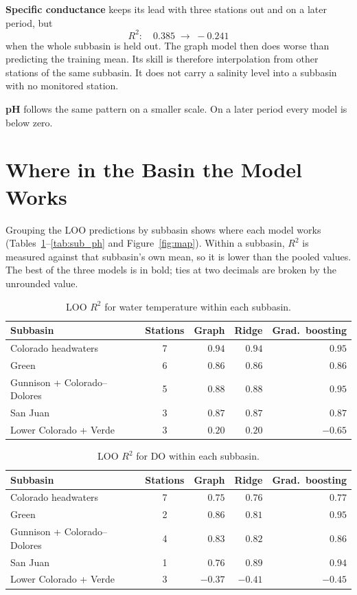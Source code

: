 \documentclass[12pt]{article}
\begin{document}
\textbf{Specific conductance} keeps its lead with three stations out and on a later period, but
\[
  R^2:\quad 0.385 \;\longrightarrow\; -0.241
\]
when the whole subbasin is held out. The graph model then does worse than predicting the training
mean. Its skill is therefore interpolation from other stations of the same subbasin. It does not
carry a salinity level into a subbasin with no monitored station.

\textbf{pH} follows the same pattern on a smaller scale. On a later period every model is below zero.

\section{Where in the Basin the Model Works}

Grouping the LOO predictions by subbasin shows where each model works
(Tables~\ref{tab:sub_wt}--\ref{tab:sub_ph} and Figure~\ref{fig:map}). Within a subbasin, $R^2$ is
measured against that subbasin's own mean, so it is lower than the pooled values. The best of the
three models is in bold; ties at two decimals are broken by the unrounded value.

\begin{table}[H]
\centering
\small
\caption{LOO $R^2$ for water temperature within each subbasin.}
\label{tab:sub_wt}
\begin{tabular}{l c rrr}
\toprule
Subbasin & Stations & Graph & Ridge & Grad.\ boosting \\
\midrule
Colorado headwaters          & 7 & $0.94$ & $0.94$ & $\mathbf{0.95}$ \\
Green                        & 6 & $0.86$ & $0.86$ & $\mathbf{0.86}$ \\
Gunnison + Colorado--Dolores & 5 & $0.88$ & $0.88$ & $\mathbf{0.95}$ \\
San Juan                     & 3 & $0.87$ & $0.87$ & $\mathbf{0.87}$ \\
Lower Colorado + Verde       & 3 & $0.20$ & $\mathbf{0.20}$ & $-0.65$ \\
\bottomrule
\end{tabular}
\end{table}

\begin{table}[H]
\centering
\small
\caption{LOO $R^2$ for DO within each subbasin.}
\label{tab:sub_do}
\begin{tabular}{l c rrr}
\toprule
Subbasin & Stations & Graph & Ridge & Grad.\ boosting \\
\midrule
Colorado headwaters          & 7 & $0.75$ & $0.76$ & $\mathbf{0.77}$ \\
Green                        & 2 & $0.86$ & $0.81$ & $\mathbf{0.95}$ \\
Gunnison + Colorado--Dolores & 4 & $0.83$ & $0.82$ & $\mathbf{0.86}$ \\
San Juan                     & 1 & $0.76$ & $0.89$ & $\mathbf{0.94}$ \\
Lower Colorado + Verde       & 3 & $\mathbf{-0.37}$ & $-0.41$ & $-0.45$ \\
\bottomrule
\end{tabular}
\end{table}
\end{document}
